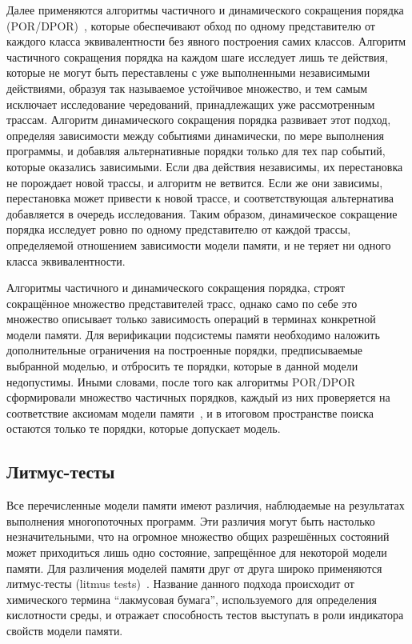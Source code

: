 Далее применяются алгоритмы частичного и динамического сокращения
порядка (POR/DPOR)~\cite{chockler2018computer, flanagan2005dynamic},
которые обеспечивают
обход по одному представителю от каждого класса эквивалентности без
явного построения самих классов.
Алгоритм частичного сокращения порядка на каждом шаге исследует лишь
те действия, которые не могут быть переставлены с уже выполненными
независимыми действиями, образуя так называемое устойчивое множество,
и тем самым исключает исследование чередований, принадлежащих уже
рассмотренным трассам.
Алгоритм динамического сокращения порядка развивает этот подход,
определяя зависимости между событиями динамически, по мере выполнения
программы, и добавляя альтернативные порядки только для тех пар
событий, которые оказались зависимыми.
Если два действия независимы, их перестановка не порождает
новой трассы, и алгоритм не ветвится. Если же они зависимы,
перестановка может привести к новой трассе, и соответствующая
альтернатива добавляется в очередь исследования.
Таким образом, динамическое сокращение порядка исследует ровно по
одному представителю от каждой трассы, определяемой отношением
зависимости модели памяти, и не теряет ни одного класса эквивалентности.

Алгоритмы частичного и динамического сокращения порядка, строят
сокращённое множество представителей трасс, однако само по себе это
множество описывает только зависимость операций в терминах конкретной
модели памяти.
Для верификации подсистемы памяти необходимо наложить дополнительные ограничения
на построенные порядки, предписываемые выбранной
моделью, и отбросить те порядки, которые в данной модели недопустимы.
Иными словами, после того как алгоритмы POR/DPOR сформировали
множество частичных порядков, каждый из них проверяется на
соответствие аксиомам модели памяти~\cite{clarke1997model}, и в
итоговом пространстве поиска
остаются только те порядки, которые допускает модель.

\subsection{Литмус-тесты}
\label{sec:litmus-intro}

Все перечисленные модели памяти имеют различия, наблюдаемые на
результатах выполнения многопоточных программ. Эти различия могут
быть настолько незначительными, что на огромное множество общих
разрешённых состояний может приходиться лишь одно состояние,
запрещённое для некоторой модели памяти. Для различения моделей
памяти друг от друга широко применяются литмус-тесты (litmus
tests)~\cite{litmus2}. Название данного подхода происходит от
химического термина ``лакмусовая бумага'', используемого для
определения кислотности среды, и отражает способность тестов
выступать в роли индикатора свойств модели памяти.

